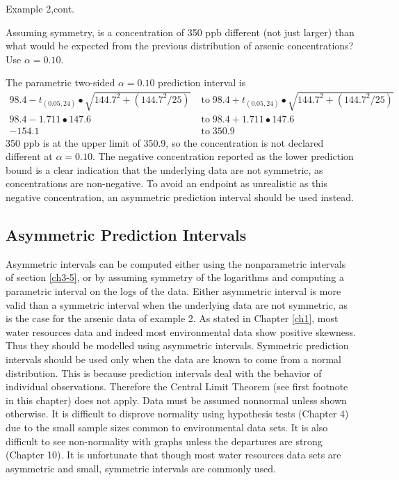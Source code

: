 \documentclass[]{book}
\begin{document}
Example 2,cont.

Assuming symmetry, is a concentration of 350 ppb different (not just larger) than what would be expected from the previous distribution of arsenic concentrations? Use \(\alpha = 0.10\).

The parametric two-sided \(\alpha = 0.10\) prediction interval is
\begin{equation}
\begin{aligned}
98.4 - t_{(0.05, 24)} \bullet \sqrt{144.7^{2} + \left( 144.7^{2} / 25 \right)} &\text{$\;$to$\;$} 98.4 + t_{(0.05, 24)} \bullet \sqrt{144.7^{2} + \left( 144.7^{2} / 25 \right)} \\
98.4 - 1.711 \bullet 147.6 &\text{$\;$to$\;$} 98.4 + 1.711 \bullet 147.6 \\
-154.1 &\text{$\;$to$\;$} 350.9
\end{aligned}
\end{equation}
350 ppb is at the upper limit of 350.9, so the concentration is not declared different at \(\alpha = 0.10\). The negative concentration reported as the lower prediction bound is a clear indication that the underlying data are not symmetric, as concentrations are non-negative. To avoid an endpoint as unrealistic as this negative concentration, an asymmetric prediction interval should be used instead.

\hypertarget{asymmetric-prediction-intervals}{%
\subsection{Asymmetric Prediction Intervals}\label{asymmetric-prediction-intervals}}

Asymmetric intervals can be computed either using the nonparametric intervals of section \ref{ch3-5}, or by assuming symmetry of the logarithms and computing a parametric interval on the logs of the data. Either asymmetric interval is more valid than a symmetric interval when the underlying data are not symmetric, as is the case for the arsenic data of example 2. As stated in Chapter \ref{ch1}, most water resources data and indeed most environmental data show positive skewness. Thus they should be modelled using asymmetric intervals. Symmetric prediction intervals should be used only when the data are known to come from a normal distribution. This is because prediction intervals deal with the behavior of individual observations. Therefore the Central Limit Theorem (see first footnote in this chapter) does not apply. Data must be assumed nonnormal unless shown otherwise. It is difficult to disprove normality using hypothesis tests (Chapter 4) due to the small sample sizes common to environmental data sets. It is also difficult to see non-normality with graphs unless the departures are strong (Chapter 10). It is unfortunate that though most water resources data sets are asymmetric and small, symmetric intervals are commonly used.
\end{document}
